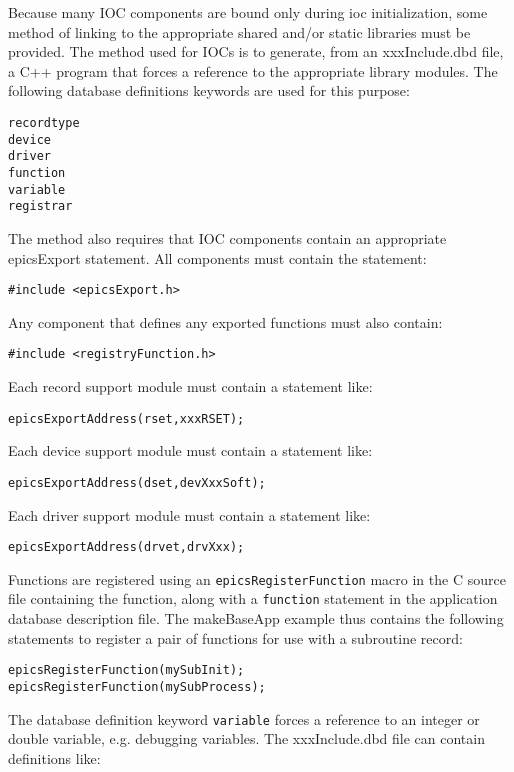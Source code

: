 Because many IOC components are bound only during ioc initialization, some method of linking to the appropriate shared 
and/or static libraries must be provided. The method used for IOCs is to generate, from an xxxInclude.dbd file, a C++ 
program that forces a reference to the appropriate library modules. The following database definitions keywords are used 
for this purpose:

\begin{verbatim}recordtype
device
driver
function
variable
registrar
\end{verbatim}The method also requires that IOC components contain an appropriate epicsExport statement. All components must 
contain the statement:

\begin{verbatim}#include <epicsExport.h>
\end{verbatim}Any component that defines any exported functions must also contain:

\begin{verbatim}#include <registryFunction.h>
\end{verbatim}Each record support module must contain a statement like:

\begin{verbatim}epicsExportAddress(rset,xxxRSET);
\end{verbatim}Each device support module must contain a statement like:

\begin{verbatim}epicsExportAddress(dset,devXxxSoft);
\end{verbatim}Each driver support module must contain a statement like:

\begin{verbatim}epicsExportAddress(drvet,drvXxx);
\end{verbatim}Functions are registered using an \verb|epicsRegisterFunction| macro in the C source file containing the function, along 
with a \verb|function| statement in the application database description file.  The makeBaseApp example thus contains the 
following statements to register a pair of functions for use with a subroutine record:

\begin{verbatim}epicsRegisterFunction(mySubInit);
epicsRegisterFunction(mySubProcess);
\end{verbatim}The database definition keyword \verb|variable| forces a reference to an integer or double variable, e.g. debugging variables. 
The xxxInclude.dbd file can contain definitions like:


